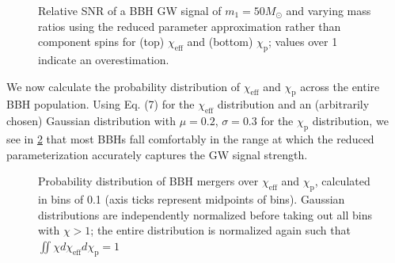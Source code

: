 \documentclass{article}
\begin{document}
\begin{figure}[!htb]
    \caption{\label{fig:spincomps} Relative SNR of a BBH GW signal of $m_1 = 50 M_\odot$ and varying mass ratios using the reduced parameter approximation rather than component spins for (top) $\chi_\text{eff}$ and (bottom) $\chi_\text{p}$; values over 1 indicate an overestimation.}
\end{figure}

We now calculate the probability distribution of $\chi_\text{eff}$ and $\chi_\text{p}$ across the entire BBH population. Using Eq. (7) for the $\chi_\text{eff}$ distribution and an (arbitrarily chosen) Gaussian distribution with $\mu = 0.2$, $\sigma = 0.3$ for the $\chi_\text{p}$ distribution, we see in \ref{fig:spinhist} that most BBHs fall comfortably in the range at which the reduced parameterization accurately captures the GW signal strength. \\

\begin{figure}[!htb]
    \caption{\label{fig:spinhist} Probability distribution of BBH mergers over $\chi_\text{eff}$ and $\chi_\text{p}$, calculated in bins of 0.1 (axis ticks represent midpoints of bins). Gaussian distributions are independently normalized before taking out all bins with $\chi > 1$; the entire distribution is normalized again such that $\iint \chi d \chi_\text{eff} d \chi_\text{p} = 1$ }
\end{figure}
\end{document}
